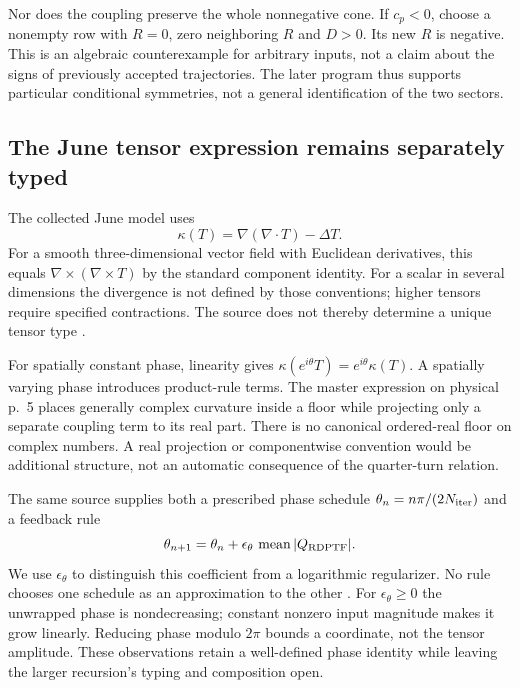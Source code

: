 \documentclass[11pt,a4paper]{article}
\theoremstyle{definition}
\numberwithin{equation}{section}
\begin{document}
Nor does the coupling preserve the whole nonnegative cone. If $c_p<0$,
choose a nonempty row with $R=0$, zero neighboring $R$ and $D>0$.
Its new $R$ is negative. This is an algebraic counterexample for arbitrary
inputs, not a claim about the signs of previously accepted trajectories.
The later program thus supports particular conditional symmetries, not
a general identification of the two sectors.

\subsection{The June tensor expression remains separately typed}
\label{sec:tensor}

The collected June model uses
\begin{equation}
 \kappa(T)=\nabla(\nabla\cdot T)-\Delta T.
 \label{eq:curvature-tensor}
\end{equation}
For a smooth three-dimensional vector field with Euclidean derivatives,
this equals $\nabla\times(\nabla\times T)$ by the standard component
identity. For a scalar in several dimensions the divergence is not
defined by those conventions; higher tensors require specified
contractions. The source does not thereby determine a unique tensor type
\cite[physical pp.~3,5,8--9]{P13}.

For spatially constant phase, linearity gives
$\kappa(e^{i\theta}T)=e^{i\theta}\kappa(T)$.
A spatially varying phase introduces product-rule terms.
The master expression on physical p.~5 places generally complex curvature
inside a floor while projecting only a separate coupling term to its real
part. There is no canonical ordered-real floor on complex numbers.
A real projection or componentwise convention would be additional structure,
not an automatic consequence of the quarter-turn relation.

The same source supplies both a prescribed phase schedule
$\theta_n=n\pi/(2N_{\rm iter})$ and a feedback rule
\begin{equation}
 \theta_{n+1}=\theta_n+
 \epsilon_\theta\,\operatorname{mean}|Q_{\rm RDPTF}|.
 \label{eq:phase-feedback}
\end{equation}
We use $\epsilon_\theta$ to distinguish this coefficient from a logarithmic
regularizer. No rule chooses one schedule as an approximation to the other
\cite[physical pp.~8--9]{P13}.
For $\epsilon_\theta\geq0$ the unwrapped phase is nondecreasing; constant
nonzero input magnitude makes it grow linearly. Reducing phase modulo
$2\pi$ bounds a coordinate, not the tensor amplitude.
These observations retain a well-defined phase identity while leaving the
larger recursion's typing and composition open.
\end{document}
